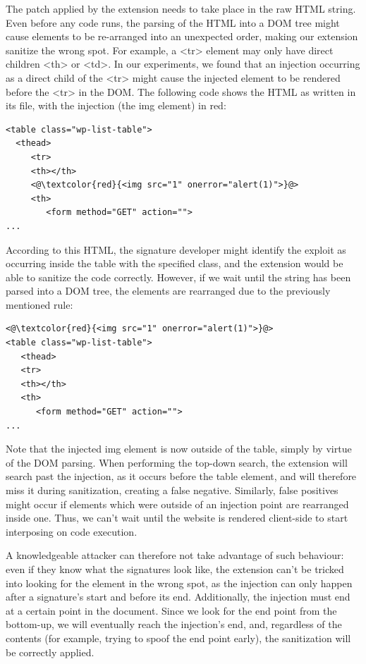 The patch applied by the extension needs to take place in the raw HTML string. Even before any code runs, the parsing of the HTML into a DOM tree might cause elements to be re-arranged into an unexpected order, making our extension sanitize the wrong spot. For example, a <tr> element may only have direct children <th> or <td>. In our experiments, we found that an injection occurring as a direct child of the <tr> might cause the injected element to be rendered before the <tr> in the DOM. The following code shows the HTML as written in its file, with the injection (the img element) in red:

\begin{lstlisting}
<table class="wp-list-table">
  <thead>
     <tr>
     <th></th>
     <@\textcolor{red}{<img src="1" onerror="alert(1)">}@>
     <th>
   	    <form method="GET" action="">
...
\end{lstlisting}

According to this HTML, the signature developer might identify the exploit as occurring inside the table with the specified class, and the extension would be able to sanitize the code correctly. However, if we wait until the string has been parsed into a DOM tree, the elements are rearranged due to the previously mentioned rule:

\begin{lstlisting}
<@\textcolor{red}{<img src="1" onerror="alert(1)">}@>
<table class="wp-list-table">
   <thead>
   <tr>
   <th></th>
   <th>
      <form method="GET" action="">
...
\end{lstlisting}

Note that the injected img element is now outside of the table, simply by virtue of the DOM parsing. When performing the top-down search, the extension will search past the injection, as it occurs before the table element, and will therefore miss it during sanitization, creating a false negative. Similarly, false positives might occur if elements which were outside of an injection point are rearranged inside one. Thus, we can't wait until the website is rendered client-side to start interposing on code execution.

A knowledgeable attacker can therefore not take advantage of such behaviour: even if they know what the signatures look like, the extension can't be tricked into looking for the element in the wrong spot, as the injection can only happen after a signature's start and before its end. Additionally, the injection must end at a certain point in the document. Since we look for the end point from the bottom-up, we will eventually reach the injection's end, and, regardless of the contents (for example, trying to spoof the end point early), the sanitization will be correctly applied.


